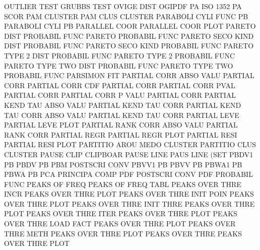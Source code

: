 OUTLIER  TEST                           GRUBBS   TEST
OVIGE    DIST                           OGIPDF
PA                                      ISO      1352 PA   SCOR
PAM                                     CLUSTER
PAM      CLUS                           CLUSTER
PARABOLI CYLI FUNC                      PB
PARABOLI CYLI                           PB
PARALLEL COOR                           PARALLEL COOR PLOT
PARETO   DIST                           PROBABIL FUNC
PARETO                                  PROBABIL FUNC
PARETO   SECO KIND DIST                 PROBABIL FUNC
PARETO   SECO KIND                      PROBABIL FUNC
PARETO   TYPE 2    DIST                 PROBABIL FUNC
PARETO   TYPE 2                         PROBABIL FUNC
PARETO   TYPE TWO  DIST                 PROBABIL FUNC
PARETO   TYPE TWO                       PROBABIL FUNC
PARSIMON                                FIT
PARTIAL  CORR ABSO VALU                 PARTIAL  CORR
PARTIAL  CORR CDF                       PARTIAL  CORR
PARTIAL  CORR PVAL                      PARTIAL  CORR
PARTIAL  CORR P    VALU                 PARTIAL  CORR
PARTIAL  KEND TAU  ABSO VALU            PARTIAL  KEND TAU  CORR
PARTIAL  KEND TAU  CORR ABSO VALU       PARTIAL  KEND TAU  CORR
PARTIAL  LEVE                           PARTIAL  LEVE PLOT
PARTIAL  RANK CORR ABSO VALU            PARTIAL  RANK CORR
PARTIAL  REGR                           PARTIAL  REGR PLOT
PARTIAL  RESI                           PARTIAL  RESI PLOT
PARTITIO AROU MEDO                      CLUSTER
PARTITIO CLUS                           CLUSTER
PAUSE    CLIP                           CLIPBOAR
PAUSE    LINE                           PAUS     LINE (SET
PBDV1                                   PB
PBDV                                    PB
PBM                                     POSTSCRI CONV
PBVV1                                   PB
PBVV                                    PB
PBWA1                                   PB
PBWA                                    PB
PCA                                     PRINCIPA COMP
PDF                                     POSTSCRI CONV
PDF                                     PROBABIL FUNC
PEAKS    OF   FREQ                      PEAKS    OF   FREQ TABL
PEAKS    OVER THRE INCR                 PEAKS    OVER THRE PLOT
PEAKS    OVER THRE INIT POIN            PEAKS    OVER THRE PLOT
PEAKS    OVER THRE INIT THRE            PEAKS    OVER THRE PLOT
PEAKS    OVER THRE ITER                 PEAKS    OVER THRE PLOT
PEAKS    OVER THRE LOAD FACT            PEAKS    OVER THRE PLOT
PEAKS    OVER THRE METH                 PEAKS    OVER THRE PLOT
PEAKS    OVER THRE                      PEAKS    OVER THRE PLOT
